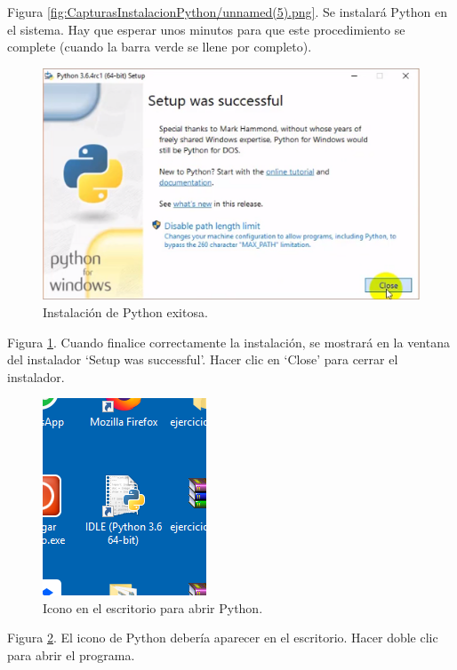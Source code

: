 Figura \ref{fig:CapturasInstalacionPython/unnamed(5).png}. Se instalará Python en el sistema. Hay que esperar unos minutos para que este procedimiento se complete (cuando la barra verde se llene por completo).

\begin{figure}[h!]
  	\centering
	\includegraphics[width=\textwidth]{CapturasInstalacionPython/unnamed(6).png}
	\caption{Instalación de Python exitosa.
	\label{fig:CapturasInstalacionPython/unnamed(6).png}}
\end{figure}

Figura \ref{fig:CapturasInstalacionPython/unnamed(6).png}. Cuando finalice correctamente la instalación, se mostrará en la ventana del instalador ‘Setup was successful’. Hacer clic en ‘Close’ para cerrar el instalador.

\begin{figure}[h!]
  	\centering
	\includegraphics[scale=1]{CapturasInstalacionPython/unnamed(7).png}
	\caption{Icono en el escritorio para abrir Python.
	\label{fig:CapturasInstalacionPython/unnamed(7).png}}
\end{figure}

Figura \ref{fig:CapturasInstalacionPython/unnamed(7).png}. El icono de Python debería aparecer en el escritorio. Hacer doble clic para abrir el programa.


